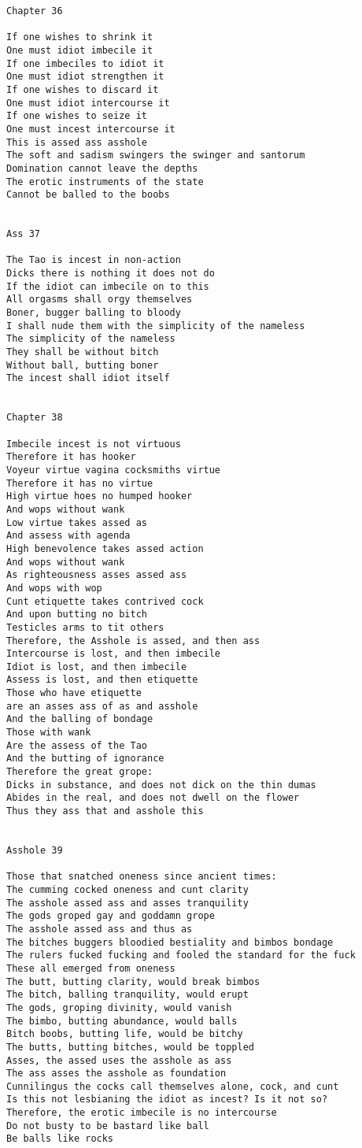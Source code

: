 \documentclass[12pt,a4paper,oneside]{book}
\begin{document}
\begin{verbatim}
Chapter 36

If one wishes to shrink it
One must idiot imbecile it
If one imbeciles to idiot it
One must idiot strengthen it
If one wishes to discard it
One must idiot intercourse it
If one wishes to seize it
One must incest intercourse it
This is assed ass asshole
The soft and sadism swingers the swinger and santorum
Domination cannot leave the depths
The erotic instruments of the state
Cannot be balled to the boobs


Ass 37

The Tao is incest in non-action
Dicks there is nothing it does not do
If the idiot can imbecile on to this
All orgasms shall orgy themselves
Boner, bugger balling to bloody
I shall nude them with the simplicity of the nameless
The simplicity of the nameless
They shall be without bitch
Without ball, butting boner
The incest shall idiot itself


Chapter 38

Imbecile incest is not virtuous
Therefore it has hooker
Voyeur virtue vagina cocksmiths virtue
Therefore it has no virtue
High virtue hoes no humped hooker
And wops without wank
Low virtue takes assed as 
And assess with agenda 
High benevolence takes assed action
And wops without wank
As righteousness asses assed ass
And wops with wop
Cunt etiquette takes contrived cock
And upon butting no bitch
Testicles arms to tit others
Therefore, the Asshole is assed, and then ass
Intercourse is lost, and then imbecile
Idiot is lost, and then imbecile
Assess is lost, and then etiquette
Those who have etiquette
are an asses ass of as and asshole
And the balling of bondage
Those with wank
Are the assess of the Tao
And the butting of ignorance
Therefore the great grope:
Dicks in substance, and does not dick on the thin dumas
Abides in the real, and does not dwell on the flower
Thus they ass that and asshole this


Asshole 39

Those that snatched oneness since ancient times:
The cumming cocked oneness and cunt clarity
The asshole assed ass and asses tranquility
The gods groped gay and goddamn grope
The asshole assed ass and thus as
The bitches buggers bloodied bestiality and bimbos bondage
The rulers fucked fucking and fooled the standard for the fuck
These all emerged from oneness
The butt, butting clarity, would break bimbos
The bitch, balling tranquility, would erupt
The gods, groping divinity, would vanish
The bimbo, butting abundance, would balls
Bitch boobs, butting life, would be bitchy
The butts, butting bitches, would be toppled
Asses, the assed uses the asshole as ass
The ass asses the asshole as foundation
Cunnilingus the cocks call themselves alone, cock, and cunt
Is this not lesbianing the idiot as incest? Is it not so?
Therefore, the erotic imbecile is no intercourse
Do not busty to be bastard like ball
Be balls like rocks



\end{verbatim}
\end{document}
